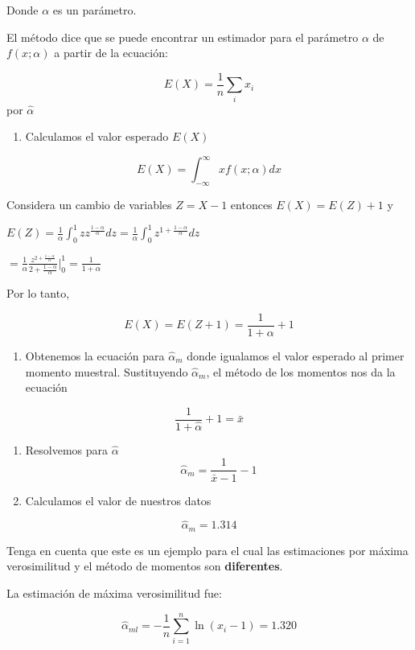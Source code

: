 \documentclass[
]{book}
\providecommand{\tightlist}{%
  \setlength{\itemsep}{0pt}\setlength{\parskip}{0pt}}
\begin{document}
Donde \(\alpha\) es un parámetro.

El método dice que se puede encontrar un estimador para el parámetro \(\alpha\) de \(f(x;\alpha)\) a partir de la ecuación:

\[E(X)=\frac{1}{n}\sum_i x_i\]
por \(\hat{\alpha}\)

\begin{enumerate}
\def\labelenumi{\arabic{enumi}.}
\tightlist
\item
  Calculamos el valor esperado \(E(X)\)
\end{enumerate}

\[E(X)=\int_{-\infty}^{\infty} xf(x;\alpha)dx\]

Considera un cambio de variables \(Z=X-1\) entonces \(E(X)=E(Z)+1\) y

\(E(Z)= \frac{1}{\alpha} \int_0^1 zz^{\frac{1-\alpha}{\alpha}}dz= \frac{1}{\alpha} \int_0^1 z^{1+\frac{1-\alpha}{\alpha}}dz\)

\(= \frac{1}{\alpha} \frac{z^{2+\frac{1-\alpha}{\alpha}}}{{2+\frac{1-\alpha}{\alpha}} } |_0^1=\frac{1}{1+\alpha}\)

Por lo tanto,

\[E(X)=E(Z+1)=\frac{1}{1+\alpha}+1\]

\begin{enumerate}
\def\labelenumi{\arabic{enumi}.}
\setcounter{enumi}{1}
\tightlist
\item
  Obtenemos la ecuación para \(\hat{\alpha}_m\) donde igualamos el valor esperado al primer momento muestral. Sustituyendo \(\hat{\alpha}_m\), el método de los momentos nos da la ecuación
\end{enumerate}

\[\frac{1}{1+\hat{\alpha}}+1=\bar{x}\]

\begin{enumerate}
\def\labelenumi{\arabic{enumi}.}
\setcounter{enumi}{2}
\item
  Resolvemos para \(\hat{\alpha}\) \[\hat{\alpha}_m=\frac{1}{\bar{x}-1}-1\]
\item
  Calculamos el valor de nuestros datos
\end{enumerate}

\[\hat{\alpha}_m=1.314\]

Tenga en cuenta que este es un ejemplo para el cual las estimaciones por máxima verosimilitud y el método de momentos son \textbf{diferentes}.

La estimación de máxima verosimilitud fue:

\[\hat{\alpha}_{ml}=-\frac{1}{n}\sum_{i=1}^n \ln (x_i-1)=1.320\]
\end{document}
